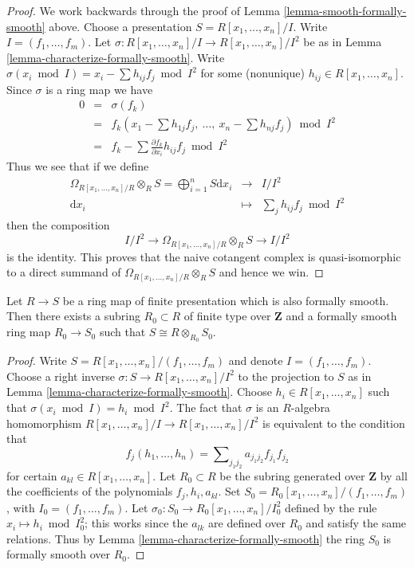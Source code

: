 \begin{proof}
We work backwards through the proof of
Lemma \ref{lemma-smooth-formally-smooth} above.
Choose a presentation $S = R[x_1, \ldots, x_n]/I$.
Write $I = (f_1, \ldots, f_m)$.
Let $\sigma : R[x_1, \ldots, x_n]/I \to R[x_1, \ldots, x_n]/I^2$
be as in Lemma \ref{lemma-characterize-formally-smooth}. Write
$\sigma(x_i \bmod I) = x_i - \sum h_{ij} f_j \bmod I^2$
for some (nonunique) $h_{ij} \in R[x_1, \ldots, x_n]$.
Since $\sigma$ is a ring map we have
\begin{eqnarray*}
0 & = & \sigma(f_k) \\
& = &
f_k(x_1 - \sum h_{1j} f_j, \ \ldots, \ x_n - \sum h_{nj} f_j) \bmod I^2 \\
& = &
f_k - \sum \frac{\partial f_k}{\partial x_i} h_{ij} f_j \bmod I^2
\end{eqnarray*}
Thus we see that if we define
\begin{eqnarray*}
\Omega_{R[x_1, \ldots, x_n]/R} \otimes_R S
=
\bigoplus\nolimits_{i = 1}^n S \text{d}x_i
& \longrightarrow &
I/I^2 \\
\text{d}x_i & \longmapsto & \sum\nolimits_j h_{ij} f_j \bmod I^2
\end{eqnarray*}
then the composition
$$
I/I^2 \longrightarrow
\Omega_{R[x_1, \ldots, x_n]/R} \otimes_R S
\longrightarrow
I/I^2
$$
is the identity. This proves that the naive cotangent complex
is quasi-isomorphic to a direct summand of
$\Omega_{R[x_1, \ldots, x_n]/R} \otimes_R S$ and hence we win.
\end{proof}

\begin{lemma}
\label{lemma-finite-presentation-fs-Noetherian}
Let $R \to S$ be a ring map of finite presentation which is
also formally smooth. Then there exists a subring $R_0 \subset R$
of finite type over $\mathbf{Z}$ and a formally smooth
ring map $R_0 \to S_0$ such that $S \cong R \otimes_{R_0} S_0$.
\end{lemma}

\begin{proof}
Write $S = R[x_1, \ldots, x_n]/(f_1, \ldots, f_m)$
and denote $I = (f_1, \ldots, f_m)$.
Choose a right inverse
$\sigma : S \to R[x_1, \ldots, x_n]/I^2$
to the projection to $S$ as in
Lemma \ref{lemma-characterize-formally-smooth}.
Choose $h_i \in R[x_1, \ldots, x_n]$ such that
$\sigma(x_i \bmod I) = h_i \bmod I^2$.
The fact that $\sigma$ is an $R$-algebra homomorphism
$R[x_1, \ldots, x_n]/I \to R[x_1, \ldots, x_n]/I^2$
is equivalent to the condition that
$$
f_j(h_1, \ldots, h_n) = \sum\nolimits_{j_1 j_2} a_{j_1 j_2} f_{j_1} f_{j_2}
$$
for certain $a_{kl} \in R[x_1, \ldots, x_n]$.
Let $R_0 \subset R$ be the subring generated over $\mathbf{Z}$
by all the coefficients of the polynomials $f_j, h_i, a_{kl}$.
Set $S_0 = R_0[x_1, \ldots, x_n]/(f_1, \ldots, f_m)$,
with $I_0 = (f_1, \ldots, f_m)$.
Let $\sigma_0 : S_0 \to R_0[x_1, \ldots, x_n]/I_0^2$ defined by
the rule $x_i \mapsto h_i \bmod I_0^2$; this works since the
$a_{lk}$ are defined over $R_0$ and satisfy the same relations.
Thus by Lemma \ref{lemma-characterize-formally-smooth}
the ring $S_0$ is formally smooth over $R_0$.
\end{proof}

